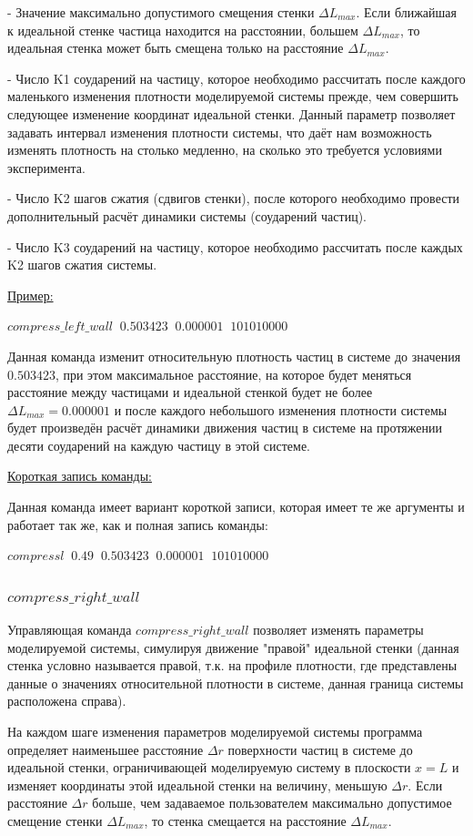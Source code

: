 \documentclass[a4paper]{article}
\begin{document}
- Значение максимально допустимого смещения стенки $ \Delta L_{max} $. Если ближайшая к идеальной стенке частица находится на расстоянии, большем $ \Delta L_{max} $, то идеальная стенка может быть смещена только на расстояние $ \Delta L_{max} $.

- Число K1 соударений на частицу, которое необходимо рассчитать после каждого маленького изменения плотности моделируемой системы прежде, чем совершить следующее изменение координат идеальной стенки. Данный параметр позволяет задавать интервал изменения плотности системы, что даёт нам возможность изменять плотность на столько медленно, на сколько  это требуется условиями эксперимента.

- Число K2 шагов сжатия (сдвигов стенки), после которого необходимо провести дополнительный расчёт динамики системы (соударений частиц).

- Число K3 соударений на частицу, которое необходимо рассчитать после каждых K2 шагов сжатия системы.

\uline{Пример:}

$ compress\_left\_wall \;\; 0.503423 \;\; 0.000001 \;\; 10 10 10000 $

Данная команда изменит относительную плотность частиц в системе до значения $ 0.503423 $, при этом максимальное расстояние, на которое будет меняться расстояние между частицами и идеальной стенкой будет не более $ \Delta L_{max} = 0.000001 $ и после каждого небольшого изменения плотности системы будет произведён расчёт динамики движения частиц в системе на протяжении десяти соударений на каждую частицу в этой системе.

\uline{Короткая запись команды:}

Данная команда имеет вариант короткой записи, которая имеет те же аргументы и работает так же, как и полная запись команды:

$ compressl \;\; 0.49 \;\; 0.503423 \;\; 0.000001 \;\; 10 10 10000 $

\subsubsection{$ compress\_right\_wall $}
Управляющая команда $ compress\_right\_wall $ позволяет изменять параметры моделируемой системы, симулируя движение "правой" идеальной стенки (данная стенка условно называется правой, т.к. на профиле плотности, где представлены данные о значениях относительной плотности в системе, данная граница системы расположена справа).

На каждом шаге изменения параметров моделируемой системы программа определяет наименьшее расстояние $ \Delta r $ поверхности частиц в системе до идеальной стенки, ограничивающей моделируемую систему в плоскости $ x = L $ и изменяет координаты этой идеальной стенки на величину, меньшую $ \Delta r $. Если расстояние $ \Delta r $ больше, чем задаваемое пользователем максимально допустимое смещение стенки $ \Delta L_{max} $, то стенка смещается на расстояние $ \Delta L_{max} $.
\end{document}
